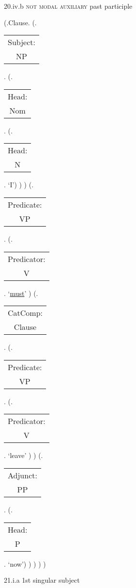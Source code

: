 \documentclass[12pt,letterpaper]{article}
\begin{document}
\begin{figure}
\begin{center}
\begin{parsetree}
		\end{parsetree}
		\hfill \break \hfill \break
		20.iv.b \textsc{not modal auxiliary} past participle
	\end{center}
\end{figure}


\begin{figure}
	\begin{center}
		\begin{parsetree}
			(.Clause.
			(.\begin{tabular}{c}Subject:\\NP\end{tabular}.  
			(.\begin{tabular}{c}Head:\\Nom\end{tabular}.
			(.\begin{tabular}{c}Head:\\N\end{tabular}. `I')
			)
			)
			(.\begin{tabular}{c}Predicate:\\VP\end{tabular}.
			(.\begin{tabular}{c}Predicator:\\V\end{tabular}.    `\underline{must}' )
			(.\begin{tabular}{c}CatComp:\\Clause\end{tabular}. 
			(.\begin{tabular}{c}Predicate:\\VP\end{tabular}.
			(.\begin{tabular}{c}Predicator:\\V\end{tabular}.    `leave' )
			)
			(.\begin{tabular}{c}Adjunct:\\PP\end{tabular}. 
			(.\begin{tabular}{c}Head:\\P\end{tabular}. `now')
			)
			)
			)
			)
			
		\end{parsetree}
		\hfill \break \hfill \break
		21.i.a 1st singular subject
	\end{center}
\end{figure}
\end{document}
